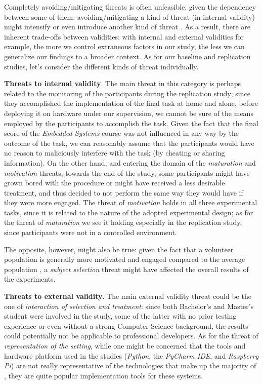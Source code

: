 Completely avoiding/mitigating threats is often unfeasible, given the dependency between some of them: avoiding/mitigating a kind of threat (\ie in internal validity) might intensify or even introduce another kind of threat \cite{DBLP:books/sp/WohlinRHOR00}. As a result, there are inherent trade-offs between validities: with internal and external validities for example, the more we control extraneous factors in our study, the less we can generalize our findings to a broader context. As for our baseline and replication studies, let's consider the different kinds of threat individually.

\noindent\textbf{Threats to internal validity}.
The main threat in this category is perhaps related to the monitoring of the participants during the replication study; since they accomplished the implementation of the final task at home and alone, before deploying it on hardware under our supervision, we cannot be sure of the means employed by the participants to accomplish the task. Given the fact that the final score of the \textit{Embedded Systems} course was not influenced in any way by the outcome of the task, we can reasonably assume that the participants would have no reason to maliciously interfere with the task (\ie by cheating or sharing information). On the other hand, and entering the domain of the \textit{maturation} and \textit{motivation} threats, towards the end of the study, some participants might have grown bored with the procedure or might have received a less desirable treatment, and thus decided to not perform the same way they would have if they were more engaged. The threat of \textit{motivation} holds in all three experimental tasks, since it is related to the nature of the adopted experimental design; as for the threat of \textit{maturation} we see it holding especially in the replication study, since participants were not in a controlled environment.

The opposite, however, might also be true: given the fact that a volunteer population is generally more motivated and engaged compared to the average population \cite{DBLP:books/sp/WohlinRHOR00}, a \textit{subject selection} threat might have affected the overall results of the experiments.

\noindent\textbf{Threats to external validity}.
The main external validity threat could be the one of \textit{interaction of selection and treatment}: since both Bachelor's and Master's student were involved in the study, some of the latter with no prior testing experience or even without a strong Computer Science background, the results could potentially not be applicable to professional developers. 
As for the threat of \textit{representation of the setting}, while one might be concerned that the tools and hardware platform used in the studies (\ie \textit{Python}, the \textit{PyCharm IDE}, and \textit{Raspberry Pi}) are not really representative of the technologies that make up the majority of \ess, they are quite popular implementation tools for these systems. 

